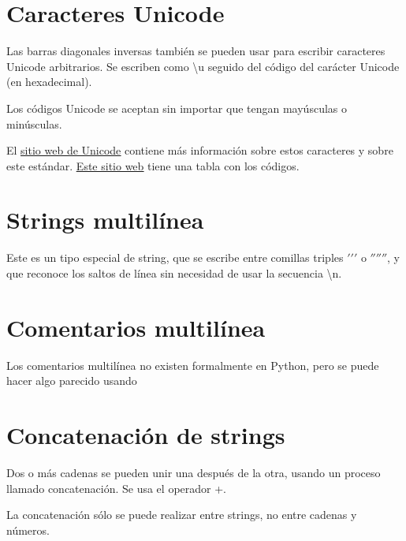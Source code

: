 \documentclass{report}
\begin{document}
\section{Caracteres Unicode}

Las barras diagonales inversas también se pueden usar para escribir caracteres Unicode arbitrarios. Se escriben como \textbackslash u seguido del código del carácter Unicode (en hexadecimal).

Los códigos Unicode se aceptan sin importar que tengan mayúsculas o minúsculas.


El \href{https://unicode.org/}{\underline{sitio web de Unicode}} contiene más información sobre estos caracteres y sobre este estándar. \href{https://unicode-table.com/en/}{\underline{Este sitio web}} tiene una tabla con los códigos.

\section{Strings multilínea}

Este es un tipo especial de string, que se escribe entre comillas triples $'$$'$$'$ o $''$$''$$''$, y que reconoce los saltos de línea sin necesidad de usar la secuencia \textbackslash n.


\section{Comentarios multilínea}

Los comentarios multilínea no existen formalmente en Python, pero se puede hacer algo parecido usando


\section{Concatenación de strings}

Dos o más cadenas se pueden unir una después de la otra, usando un proceso llamado concatenación. Se usa el operador +.


La concatenación sólo se puede realizar entre strings, no entre cadenas y números.

\end{document}
